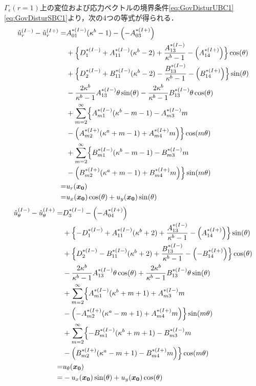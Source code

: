 $\Gamma_{\epsilon}(r=1)$上の変位および応力ベクトルの境界条件\eqref{eq:GovDisturUBC1}\eqref{eq:GovDisturSBC1}より，次の4つの等式が得られる．
\begin{align}
	\hat{u}_{r}^{(I-)}-\hat{u}_{r}^{(I+)} =&A_{01}^{*(I-)}(\kappa^{b}-1)-\Bigl(-A_{03}^{*(I+)}\Bigr)
	\nonumber
	\\
	&+\Bigl\{D_{1}^{*(I-)}+A_{11}^{*(I-)}(\kappa^{b}-2)+\frac{A_{13}^{*(I-)}}{\kappa^{b}-1}
	-\Bigl(A_{14}^{*(I+)}\Bigr)\Bigr\}\cos(\theta)
	\nonumber
	\\
	&+\Bigl\{D_{2}^{*(I-)}+B_{11}^{*(I-)}(\kappa^{b}-2)-\frac{B_{13}^{*(I-)}}{\kappa^{b}-1}
	-\Bigl(B_{14}^{*(I+)}\Bigr)\Bigr\}\sin(\theta)
	\nonumber
	\\
	&-\frac{2\kappa^{b}}{\kappa^{b}-1}A_{13}^{*(I-)}\theta\sin(\theta)
	-\frac{2\kappa^{b}}{\kappa^{b}-1}B_{13}^{*(I-)}\theta\cos(\theta)
	\nonumber
	\\
	&+\sum_{m=2}^{\infty}\Bigl\{A_{m1}^{*(I-)}(\kappa^{b}-m-1)
	-A_{m3}^{*(I-)}m
	\nonumber
	\\
	&-\Bigl(A_{m2}^{*(I+)}(\kappa^{a}+m-1)
	+A_{m4}^{*(I+)}m\Bigr)\Bigr\}\cos(m\theta)
	\nonumber
	\\
	&+\sum_{m=2}^{\infty}\Bigl\{B_{m1}^{*(I-)}(\kappa^{b}-m-1)
	-B_{m3}^{*(I-)}m
	\nonumber
	\\
	&-\Bigl(B_{m2}^{*(I+)}(\kappa^{a}+m-1)
	+B_{m4}^{*(I+)}m\Bigr)\Bigr\}\sin(m\theta)
	\nonumber
	\\
	=&u_{r}(\bm{x_{0}})
	\nonumber
	\\
	=&u_{x}(\bm{x_{0}})\cos(\theta)+u_{y}(\bm{x_{0}})\sin(\theta)
	\label{eq:UR1eq}
\end{align}
\begin{align}
	\hat{u}_{\theta}^{(I-)}-\hat{u}_{\theta}^{(I+)} =&D_{3}^{*(I-)}-\Bigl(-A_{04}^{*(I+)}\Bigr)
	\nonumber
	\\
	&+\Bigl\{-D_{1}^{*(I-)}+A_{11}^{*(I-)}(\kappa^{b}+2)+\frac{A_{13}^{*(I-)}}{\kappa^{b}-1}
	-\Bigl(A_{14}^{*(I+)}\Bigr)\Bigr\}\sin(\theta)
	\nonumber
	\\
	&+\Bigl\{D_{2}^{*(I-)}-B_{11}^{*(I-)}(\kappa^{b}+2)+\frac{B_{13}^{*(I-)}}{\kappa^{b}-1}
	-\Bigl(-B_{14}^{*(I+)}\Bigr)\Bigr\}\cos(\theta)
	\nonumber
	\\
	&-\frac{2\kappa^{b}}{\kappa^{b}-1}A_{13}^{*(I-)}\theta\cos(\theta)
	+\frac{2\kappa^{b}}{\kappa^{b}-1}B_{13}^{*(I-)}\theta\sin(\theta)
	\nonumber
	\\
	&+\sum_{m=2}^{\infty}\Bigl\{A_{m1}^{*(I-)}(\kappa^{b}+m+1)
	+A_{m3}^{*(I-)}m
	\nonumber
	\\
	&-\Bigl(-A_{m2}^{*(I+)}(\kappa^{a}-m+1)
	+A_{m4}^{*(I+)}m\Bigr)\Bigr\}\sin(m\theta)
	\nonumber
	\\
	&+\sum_{m=2}^{\infty}\Bigl\{-B_{m1}^{*(I-)}(\kappa^{b}+m+1)
	-B_{m3}^{*(I-)}m
	\nonumber
	\\
	&-\Bigl(B_{m2}^{*(I+)}(\kappa^{a}-m+1)
	-B_{m4}^{*(I+)}m\Bigr)\Bigr\}\cos(m\theta)
	\nonumber
	\\
	=&u_{\theta}(\bm{x_{0}})
	\nonumber
	\\
	=&-u_{x}(\bm{x_{0}})\sin(\theta)+u_{y}(\bm{x_{0}})\cos(\theta)
	\label{eq:UTh1eq}
\end{align}

